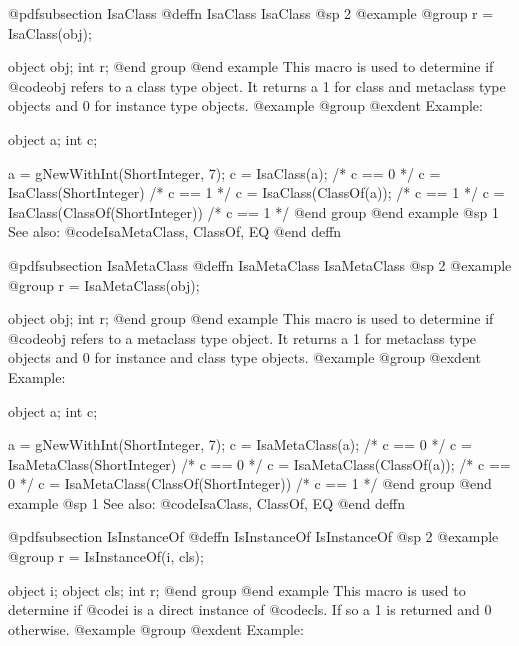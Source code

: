 {{{{@pdfsubsection {IsaClass}
@deffn {IsaClass} IsaClass
@sp 2
@example
@group
r = IsaClass(obj);

object  obj;
int     r;
@end group
@end example
This macro is used to determine if @code{obj} refers to a class type
object.  It returns a 1 for class and metaclass type objects and 0 for
instance type objects.
@example
@group
@exdent Example:

object  a;
int     c;

a = gNewWithInt(ShortInteger, 7);
c = IsaClass(a);            /* c == 0  */
c = IsaClass(ShortInteger)  /* c == 1  */
c = IsaClass(ClassOf(a));   /* c == 1  */
c = IsaClass(ClassOf(ShortInteger))  /* c == 1  */
@end group
@end example
@sp 1
See also:  @code{IsaMetaClass, ClassOf, EQ}
@end deffn


















@pdfsubsection {IsaMetaClass}
@deffn {IsaMetaClass} IsaMetaClass
@sp 2
@example
@group
r = IsaMetaClass(obj);

object  obj;
int     r;
@end group
@end example
This macro is used to determine if @code{obj} refers to a metaclass
type object.  It returns a 1 for metaclass type objects and 0 for
instance and class type objects.
@example
@group
@exdent Example:

object  a;
int     c;

a = gNewWithInt(ShortInteger, 7);
c = IsaMetaClass(a);            /* c == 0  */
c = IsaMetaClass(ShortInteger)  /* c == 0  */
c = IsaMetaClass(ClassOf(a));   /* c == 0  */
c = IsaMetaClass(ClassOf(ShortInteger))  /* c == 1  */
@end group
@end example
@sp 1
See also:  @code{IsaClass, ClassOf, EQ}
@end deffn














@pdfsubsection {IsInstanceOf}
@deffn {IsInstanceOf} IsInstanceOf
@sp 2
@example
@group
r = IsInstanceOf(i, cls);

object  i;
object  cls;
int     r;
@end group
@end example
This macro is used to determine if @code{i} is a direct
instance of @code{cls}.  If so a 1 is returned and 0 otherwise.
@example
@group
@exdent Example:

}}}}
